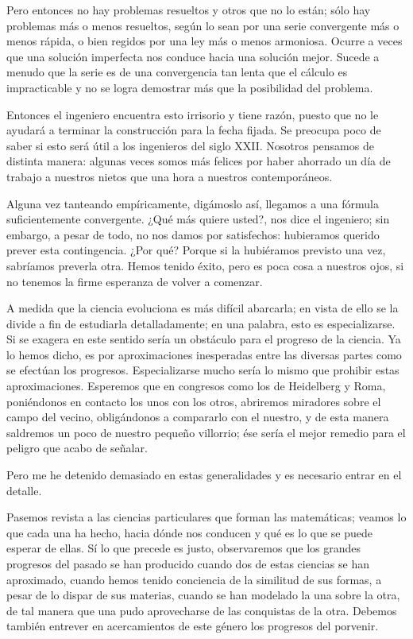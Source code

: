 \documentclass[a4paper, 12pt]{article}
\begin{document}
Pero entonces no hay problemas resueltos y otros que no lo están; sólo hay problemas más o menos resueltos, según lo sean por una serie
convergente más o menos rápida, o bien regidos por una ley más o
menos armoniosa. Ocurre a veces que una solución imperfecta nos conduce
hacia una solución mejor. Sucede a menudo que la serie es de una
convergencia tan lenta que el cálculo es impracticable y no se logra
demostrar más que la posibilidad del problema.

Entonces el ingeniero encuentra esto irrisorio y tiene razón, puesto que
no le ayudará a terminar la construcción para la fecha fijada. Se
preocupa poco de saber si esto será útil a los ingenieros del siglo
XXII. Nosotros pensamos de distinta manera: algunas veces somos
más felices por haber ahorrado un día de trabajo a nuestros nietos
que una hora a nuestros contemporáneos.

Alguna vez tanteando empíricamente, digámoslo así, llegamos a
una fór\-mula suficientemente convergente. ¿Qué más quiere
usted?, nos dice el ingeniero; sin embargo, a pesar de todo, no nos damos
por satisfechos: hubieramos querido prever esta contingencia. ¿Por qué?
Porque si la hubiéramos previsto una vez, sabríamos preverla otra.
Hemos tenido éxito, pero es poca cosa a nuestros ojos, si no tenemos la
firme esperanza de volver a comenzar.

A medida que la ciencia evoluciona es más difícil abarcarla; en
vista de ello se la divide a fin de estudiarla detalladamente; en una
palabra, esto es especializarse. Si se exagera en este sentido sería un
obstáculo para el progreso de la ciencia. Ya lo hemos dicho, es por
aproximaciones inesperadas entre las diversas partes como se efectúan
los progresos. Especializarse mucho sería lo mismo que prohibir estas
aproximaciones. Esperemos que en congresos como los de Heidelberg y Roma,
poniéndonos en contacto los unos con los otros, abriremos miradores
sobre el campo del vecino, obligándonos a compararlo con el nuestro, y
de esta manera saldremos un poco de nuestro pequeño villorrio; ése sería el mejor remedio para el peligro que acabo de señalar.

Pero me he detenido demasiado en estas generalidades y es necesario entrar
en el detalle.


Pasemos revista a las ciencias particulares que forman las matemáticas;
veamos lo que cada una ha hecho, hacia dónde nos conducen y qué es
lo que se puede esperar de ellas. Sí lo que precede es justo,
observaremos que los grandes progresos del pasado se han producido cuando
dos de estas ciencias se han aproximado, cuando hemos tenido conciencia de
la similitud de sus formas, a pesar de lo dispar de sus materias, cuando se
han modelado la una sobre la otra, de tal manera que una pudo aprovecharse
de las conquistas de la otra. Debemos también entrever en acercamientos
de este género los progresos del porvenir.
\end{document}
